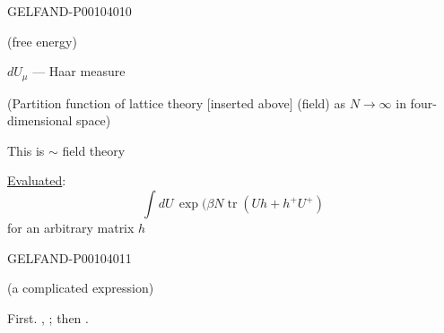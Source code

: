 \begin{GelfandAdjacentEvidence}{GELFAND-P001040}{10}

(free energy)

$dU_\mu$ --- Haar measure

(Partition function of lattice theory [inserted above] (field) as $N\to\infty$ in four-dimensional space)

This is $\sim$ field theory

\underline{Evaluated}:
\begin{equation*}
\int dU\,\exp\bigl(\beta N\operatorname{tr}(Uh+h^+U^+)
\tag{20}
\end{equation*}
for an arbitrary matrix $h$
\end{GelfandAdjacentEvidence}
\begin{GelfandAdjacentEvidence}{GELFAND-P001040}{11}


(a complicated expression)

First. , ; then .
\end{GelfandAdjacentEvidence}



